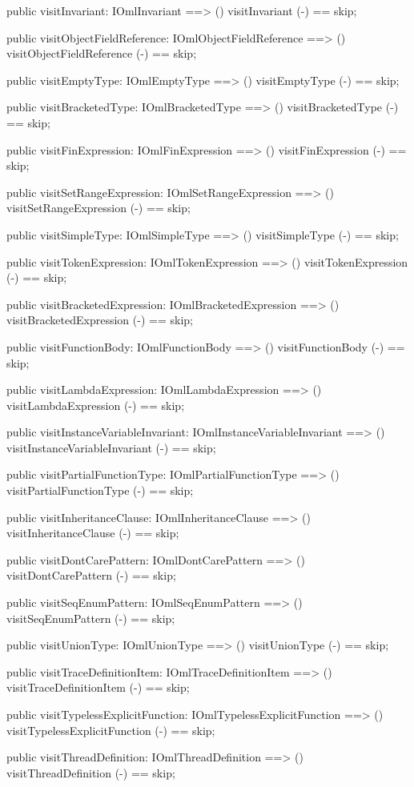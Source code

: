 \begin{vdm_al}
  public visitInvariant: IOmlInvariant ==> ()
  visitInvariant (-) == skip;

  public visitObjectFieldReference: IOmlObjectFieldReference ==> ()
  visitObjectFieldReference (-) == skip;

  public visitEmptyType: IOmlEmptyType ==> ()
  visitEmptyType (-) == skip;

  public visitBracketedType: IOmlBracketedType ==> ()
  visitBracketedType (-) == skip;

  public visitFinExpression: IOmlFinExpression ==> ()
  visitFinExpression (-) == skip;

  public visitSetRangeExpression: IOmlSetRangeExpression ==> ()
  visitSetRangeExpression (-) == skip;

  public visitSimpleType: IOmlSimpleType ==> ()
  visitSimpleType (-) == skip;

  public visitTokenExpression: IOmlTokenExpression ==> ()
  visitTokenExpression (-) == skip;

  public visitBracketedExpression: IOmlBracketedExpression ==> ()
  visitBracketedExpression (-) == skip;

  public visitFunctionBody: IOmlFunctionBody ==> ()
  visitFunctionBody (-) == skip;

  public visitLambdaExpression: IOmlLambdaExpression ==> ()
  visitLambdaExpression (-) == skip;

  public visitInstanceVariableInvariant: IOmlInstanceVariableInvariant ==> ()
  visitInstanceVariableInvariant (-) == skip;

  public visitPartialFunctionType: IOmlPartialFunctionType ==> ()
  visitPartialFunctionType (-) == skip;

  public visitInheritanceClause: IOmlInheritanceClause ==> ()
  visitInheritanceClause (-) == skip;

  public visitDontCarePattern: IOmlDontCarePattern ==> ()
  visitDontCarePattern (-) == skip;

  public visitSeqEnumPattern: IOmlSeqEnumPattern ==> ()
  visitSeqEnumPattern (-) == skip;

  public visitUnionType: IOmlUnionType ==> ()
  visitUnionType (-) == skip;

  public visitTraceDefinitionItem: IOmlTraceDefinitionItem ==> ()
  visitTraceDefinitionItem (-) == skip;

  public visitTypelessExplicitFunction: IOmlTypelessExplicitFunction ==> ()
  visitTypelessExplicitFunction (-) == skip;

  public visitThreadDefinition: IOmlThreadDefinition ==> ()
  visitThreadDefinition (-) == skip;


\end{vdm_al}

